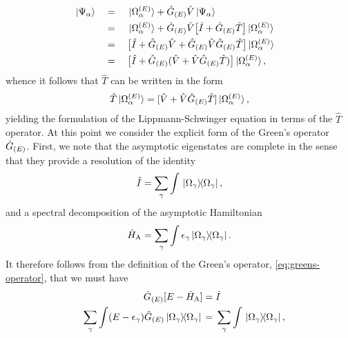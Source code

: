\documentclass[draft]{article}
\begin{document}
\begin{alignat*}{4}
  &
  \ket{\Psi_{\alpha}}
  &&
  {}={}
  &&
  \ket*{\Omega_{\alpha}^{\lr{E}}}
  +
  \hat{G}_{\lr{E}}
  \hat{V}
  \ket{\Psi_{\alpha}}
  &
  \\
  &
  &&
  {}={}
  &&
  \ket*{\Omega_{\alpha}^{\lr{E}}}
  +
  \hat{G}_{\lr{E}}
  \hat{V}
  \lrsq[\big]
  {
    \hat{I}
    +
    \hat{G}_{\lr{E}}
    \hat{T}
  }
  \ket*{\Omega_{\alpha}^{\lr{E}}}
  &
  \\
  &
  &&
  {}={}
  &&
  \lrsq[\big]
  {
    \hat{I}
    +
    \hat{G}_{\lr{E}}
    \hat{V}
    +
    \hat{G}_{\lr{E}}
    \hat{V}
    \hat{G}_{\lr{E}}
    \hat{T}
  }
  \ket*{\Omega_{\alpha}^{\lr{E}}}
  &
  \\
  &
  &&
  {}={}
  &&
  \lrsq[\big]
  {
    \hat{I}
    +
    \hat{G}_{\lr{E}}
    \lr
    {
      \hat{V}
      +
      \hat{V}
      \hat{G}_{\lr{E}}
      \hat{T}
    }
  }
  \ket*{\Omega_{\alpha}^{\lr{E}}}
  ,
  &
\end{alignat*}
whence it follows that $\hat{T}$ can be written in the form
\begin{equation}
  \label{eq:ls-t-greens}
  \hat{T}
  \ket*{\Omega_{\alpha}^{\lr{E}}}
  =
  \lrsq
  {
    \hat{V}
    +
    \hat{V}
    \hat{G}_{\lr{E}}
    \hat{T}
  }
  \ket*{\Omega_{\alpha}^{\lr{E}}}
  ,
\end{equation}
yielding the formulation of the Lippmann-Schwinger equation in terms of the
$\hat{T}$ operator.
At this point we consider the explicit form of the Green's operator
$\hat{G}_{\lr{E}}$.
First, we note that the asymptotic eigenstates are complete in the sense that
they provide a resolution of the identity
\begin{equation}
  \label{eq:asymptotic-complete}
  \hat{I}
  =
  \sum_{\gamma}\int
  \ketbra*{\Omega_{\gamma}}{\Omega_{\gamma}}
  ,
\end{equation}
and a spectral decomposition of the asymptotic Hamiltonian
\begin{equation*}
  \hat{H}_{\rm{A}}
  =
  \sum_{\gamma}\int
  \epsilon_{\gamma}
  \ketbra*{\Omega_{\gamma}}{\Omega_{\gamma}}
  .
\end{equation*}
It therefore follows from the definition of the Green's operator,
\autoref{eq:greens-operator}, that we must have
\begin{alignat*}{2}
  &
  &
  \hat{G}_{\lr{E}}
  \lrsq
  {
    E
    -
    \hat{H}_{\rm{A}}
  }
  {}={}
  &
  \hat{I}
  \\
  &
  &
  \sum_{\gamma}\int
  \lr
  {
    E
    -
    \epsilon_{\gamma}
  }
  \hat{G}_{\lr{E}}
  \ketbra*{\Omega_{\gamma}}{\Omega_{\gamma}}
  {}={}
  &
  \sum_{\gamma}\int
  \ketbra*{\Omega_{\gamma}}{\Omega_{\gamma}}
  ,
\end{alignat*}
\end{document}

